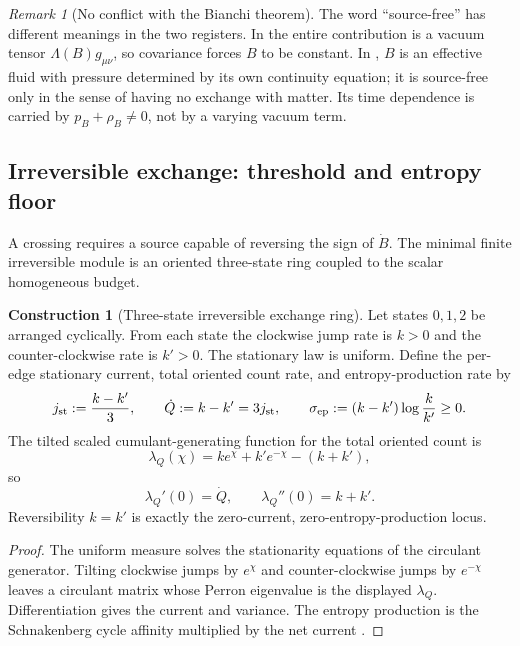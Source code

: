 \documentclass[11pt]{article}
\theoremstyle{definition}
\newtheorem{construction}[theorem]{Construction}
\theoremstyle{remark}
\newtheorem{remark}[theorem]{Remark}
\begin{document}
\begin{remark}[No conflict with the Bianchi theorem]
The word ``source-free'' has different meanings in the two registers.  In
 the entire contribution is a
vacuum tensor \(\Lambda(B)g_{\mu\nu}\), so covariance forces \(B\) to be
constant.  In , \(B\) is an effective fluid
with pressure determined by its own continuity equation; it is source-free only
in the sense of having no exchange with matter.  Its time dependence is carried
by \(p_B+\rho_B\ne0\), not by a varying vacuum term.
\end{remark}

\subsection{Irreversible exchange: threshold and entropy floor}
\label{subsec:irreversible-deficiency-exchange}

A crossing requires a source capable of reversing the sign of \(\dot B\).  The
minimal finite irreversible module is an oriented three-state ring coupled to
the scalar homogeneous budget.

\begin{construction}[Three-state irreversible exchange ring]
\label{constr:dark-energy-ring}
Let states \(0,1,2\) be arranged cyclically.  From each state the clockwise jump
rate is \(k>0\) and the counter-clockwise rate is \(k'>0\).  The stationary law
is uniform.  Define the per-edge stationary current, total oriented count rate,
and entropy-production rate by
\[
 j_{\rm st}:=\frac{k-k'}{3},
 \qquad
 \dot Q:=k-k'=3j_{\rm st},
 \qquad
 \sigma_{\rm ep}:=(k-k')\log\frac{k}{k'}\ge0.
\]
The tilted scaled cumulant-generating function for the total oriented count is
\[
  \lambda_Q(\chi)=ke^\chi+k'e^{-\chi}-(k+k'),
\]
so
\[
  \lambda_Q'(0)=\dot Q,
  \qquad
  \lambda_Q''(0)=k+k'.
\]
Reversibility \(k=k'\) is exactly the zero-current, zero-entropy-production
locus.
\end{construction}

\begin{proof}
The uniform measure solves the stationarity equations of the circulant
generator.  Tilting clockwise jumps by \(e^\chi\) and counter-clockwise jumps by
\(e^{-\chi}\) leaves a circulant matrix whose Perron eigenvalue is the displayed
\(\lambda_Q\).  Differentiation gives the current and variance.  The entropy
production is the Schnakenberg cycle affinity multiplied by the net current
\cite{Hill,Schnakenberg}.
\end{proof}
\end{document}
